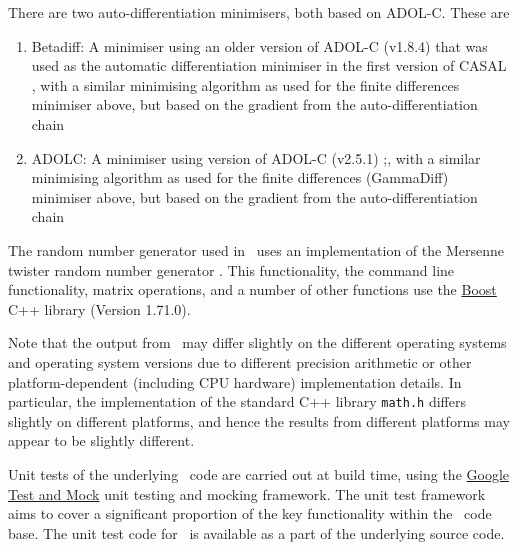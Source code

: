 There are two auto-differentiation minimisers, both based on ADOL-C. These are
\begin{enumerate}
\item Betadiff: A minimiser using an older version of ADOL-C (v1.8.4) that was used as the automatic differentiation minimiser in the first version of CASAL \citep{1388}, with a similar minimising algorithm as used for the finite differences minimiser above, but based on the gradient from the auto-differentiation chain
\item ADOLC: A minimiser using version of ADOL-C (v2.5.1) \citep{walther1996adolc};, with a similar minimising algorithm as used for the finite differences (GammaDiff) minimiser above, but based on the gradient from the auto-differentiation chain
\end{enumerate}

The random number generator used in \CNAME\ uses an implementation of the Mersenne twister random number generator \citep{796}. This functionality, the command line functionality, matrix operations, and a number of other functions use the \href{http://www.boost.org/}{Boost} C++ library (Version 1.71.0).

Note that the output from \CNAME\ may differ slightly on the different operating systems and operating system versions due to different precision arithmetic or other platform-dependent (including CPU hardware) implementation details. In particular, the implementation of the standard C++ library \texttt{math.h} differs slightly on different platforms, and hence the results from different platforms may appear to be slightly different.

Unit tests of the underlying \CNAME\ code are carried out at build time, using the \href{https://github.com/google/googletest}{Google Test and Mock} unit testing and mocking framework. The unit test framework aims to cover a significant proportion of the key functionality within the \CNAME\ code base. The unit test code for \CNAME\ is available as a part of the underlying source code.

